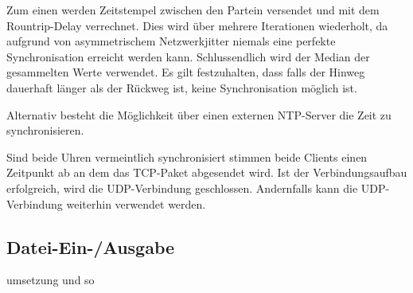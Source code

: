 Zum einen werden Zeitstempel zwischen den Partein versendet und mit dem Rountrip-Delay verrechnet. Dies wird über mehrere Iterationen wiederholt, da aufgrund von asymmetrischem Netzwerkjitter niemals eine perfekte Synchronisation erreicht werden kann. Schlussendlich wird der Median der gesammelten Werte verwendet. Es gilt festzuhalten, dass falls der Hinweg dauerhaft länger als der Rückweg ist, keine Synchronisation möglich ist.

Alternativ besteht die Möglichkeit über einen externen NTP-Server die Zeit zu synchronisieren.

Sind beide Uhren vermeintlich synchronisiert stimmen beide Clients einen Zeitpunkt ab an dem das TCP-Paket abgesendet wird. Ist der Verbindungsaufbau erfolgreich, wird die UDP-Verbindung geschlossen. Andernfalls kann die UDP-Verbindung weiterhin verwendet werden.

\subsection{Datei-Ein-/Ausgabe}
umsetzung und so
